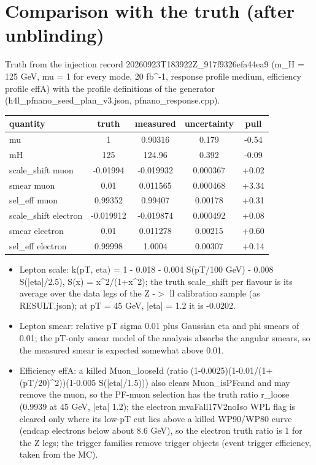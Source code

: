 \documentclass[11pt,a4paper]{article}
\begin{document}
\section{Comparison with the truth (after unblinding)}
Truth from the injection record 20260923T183922Z\_917f9326efa44ea9 (m\_H = 125 GeV, mu = 1 for every mode, 20 fb\^{}-1, response profile medium, efficiency profile effA) with the profile definitions of the generator (h4l\_pfnano\_seed\_plan\_v3.json, pfnano\_response.cpp).

\begin{table}[H]\centering\small\begin{tabular}{lcccc}\toprule quantity & truth & measured & uncertainty & pull\\\midrule
mu & 1 & 0.90316 & 0.179 & -0.54\\
mH & 125 & 124.96 & 0.392 & -0.09\\
scale\_shift muon & -0.01994 & -0.019932 & 0.000367 & +0.02\\
smear muon & 0.01 & 0.011565 & 0.000468 & +3.34\\
sel\_eff muon & 0.99352 & 0.99407 & 0.00178 & +0.31\\
scale\_shift electron & -0.019912 & -0.019874 & 0.000492 & +0.08\\
smear electron & 0.01 & 0.011278 & 0.00215 & +0.60\\
sel\_eff electron & 0.99998 & 1.0004 & 0.00307 & +0.14\\
\bottomrule\end{tabular}\end{table}
\begin{itemize}
\item Lepton scale: k(pT, eta) = 1 - 0.018 - 0.004 S(pT/100 GeV) - 0.008 S(|eta|/2.5), S(x) = x\^{}2/(1+x\^{}2); the truth scale\_shift per flavour is its average over the data legs of the Z -$>$ ll calibration sample (as RESULT.json); at pT = 45 GeV, |eta| = 1.2 it is -0.0202.
\item Lepton smear: relative pT sigma 0.01 plus Gaussian eta and phi smears of 0.01; the pT-only smear model of the analysis absorbs the angular smears, so the measured smear is expected somewhat above 0.01.
\item Efficiency effA: a killed Muon\_looseId (ratio (1-0.0025)(1-0.01/(1+(pT/20)\^{}2))(1-0.005 S(|eta|/1.5))) also clears Muon\_isPFcand and may remove the muon, so the PF-muon selection has the truth ratio r\_loose (0.9939 at 45 GeV, |eta| 1.2); the electron mvaFall17V2noIso WPL flag is cleared only where its low-pT cut lies above a killed WP90/WP80 curve (endcap electrons below about 8.6 GeV), so the electron truth ratio is 1 for the Z legs; the trigger families remove trigger objects (event trigger efficiency, taken from the MC).
\end{itemize}
\end{document}
